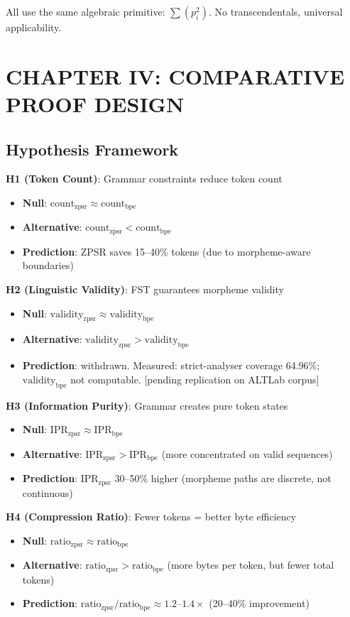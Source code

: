 \documentclass[11pt,oneside]{article}
\begin{document}
All use the same algebraic primitive: $\sum(p_i^2)$. No transcendentals, universal applicability.

\section{CHAPTER IV: COMPARATIVE PROOF DESIGN}

\subsection{Hypothesis Framework}

\textbf{H1 (Token Count)}: Grammar constraints reduce token count
\begin{itemize}
  \item \textbf{Null}: $\text{count}_{\text{zpsr}} \approx \text{count}_{\text{bpe}}$
  \item \textbf{Alternative}: $\text{count}_{\text{zpsr}} < \text{count}_{\text{bpe}}$
  \item \textbf{Prediction}: ZPSR saves 15--40\% tokens (due to morpheme-aware boundaries)
\end{itemize}

\textbf{H2 (Linguistic Validity)}: FST guarantees morpheme validity
\begin{itemize}
  \item \textbf{Null}: $\text{validity}_{\text{zpsr}} \approx \text{validity}_{\text{bpe}}$
  \item \textbf{Alternative}: $\text{validity}_{\text{zpsr}} > \text{validity}_{\text{bpe}}$
  \item \textbf{Prediction}: withdrawn. Measured: strict-analyser coverage 64.96\%; $\text{validity}_{\text{bpe}}$ not computable. [pending replication on ALTLab corpus]
\end{itemize}

\textbf{H3 (Information Purity)}: Grammar creates pure token states
\begin{itemize}
  \item \textbf{Null}: $\text{IPR}_{\text{zpsr}} \approx \text{IPR}_{\text{bpe}}$
  \item \textbf{Alternative}: $\text{IPR}_{\text{zpsr}} > \text{IPR}_{\text{bpe}}$ (more concentrated on valid sequences)
  \item \textbf{Prediction}: IPR$_{\text{zpsr}}$ 30--50\% higher (morpheme paths are discrete, not continuous)
\end{itemize}

\textbf{H4 (Compression Ratio)}: Fewer tokens = better byte efficiency
\begin{itemize}
  \item \textbf{Null}: $\text{ratio}_{\text{zpsr}} \approx \text{ratio}_{\text{bpe}}$
  \item \textbf{Alternative}: $\text{ratio}_{\text{zpsr}} > \text{ratio}_{\text{bpe}}$ (more bytes per token, but fewer total tokens)
  \item \textbf{Prediction}: $\text{ratio}_{\text{zpsr}} / \text{ratio}_{\text{bpe}} \approx 1.2$--$1.4\times$ (20--40\% improvement)
\end{itemize}
\end{document}
